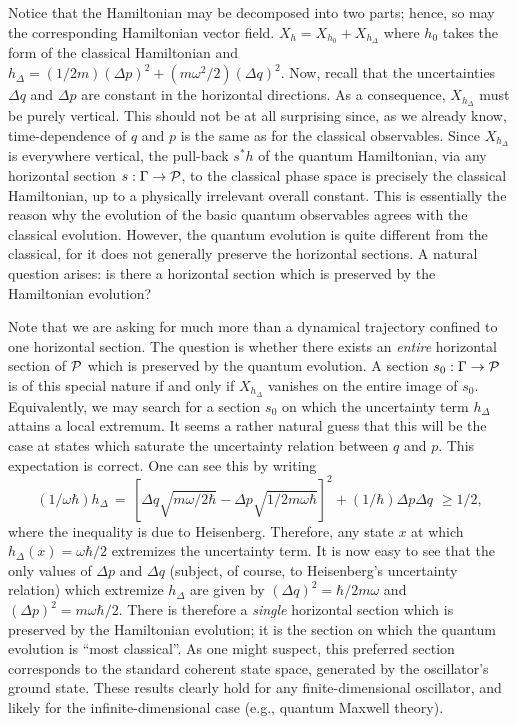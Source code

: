 \documentclass[12pt,aps,eqsecnum,tighten]{revtex4-2}
\def\be{\begin{equation}}
\def\ee{\end{equation}}
\def\P{{\cal P}}
\def\w{\omega}
\newcommand{\hvf}[1]{{X_{#1}}}
\begin{document}
Notice that the Hamiltonian may be decomposed into two parts; hence,
so may the corresponding Hamiltonian vector field.  $\hvf{h} =
\hvf{h_0} + \hvf{h_\Delta}$ where $h_0$ takes the form of the
classical Hamiltonian and $h_\Delta = (1/2m)(\Delta p)^2 +
(m\w^2/2)(\Delta q)^2$.  Now, recall that the uncertainties $\Delta q$
and $\Delta p$ are constant in the horizontal directions.  As a
consequence, $\hvf{h_\Delta}$ must be purely vertical.  This should
not be at all surprising since, as we already know, time-dependence of
$q$ and $p$ is the same as for the classical observables.  Since
$\hvf{h_\Delta}$ is everywhere vertical, the pull-back $s^* h$ of the
quantum Hamiltonian, via any horizontal section $s : \Gamma
\rightarrow \P$, to the classical phase space is precisely the
classical Hamiltonian, up to a physically irrelevant overall constant.
This is essentially the reason why the evolution of the basic quantum
observables agrees with the classical evolution.  However, the quantum
evolution is quite different from the classical, for it does not
generally preserve the horizontal sections.  A natural question
arises: is there a horizontal section which is preserved by the
Hamiltonian evolution?  

Note that we are asking for much more than a dynamical trajectory
confined to one horizontal section. The question is whether there
exists an {\it entire} horizontal section of $\P$ which is preserved
by the quantum evolution.  A section $s_0 : \Gamma \rightarrow \P$ is
of this special nature if and only if $\hvf{h_\Delta}$ vanishes on the
entire image of $s_0$.  Equivalently, we may search for a section
$s_0$ on which the uncertainty term $h_\Delta$ attains a local
extremum.  It seems a rather natural guess that this will be the case
at states which saturate the uncertainty relation between $q$ and $p$.
This expectation is correct.  One can see this by writing
%
\be 
(1/\w\hbar) h_\Delta \, = \, \left[ \Delta q \sqrt{m\w/2\hbar} -
\Delta p \sqrt{1/2m\w\hbar} \right]^2 + (1/\hbar) \Delta p \Delta q
\,\, \ge 1/2, 
\ee 
%
where the inequality is due to Heisenberg.  Therefore, any state $x$
at which $h_\Delta(x) = \w\hbar/2$ extremizes the uncertainty term.
It is now easy to see that the only values of $\Delta p$ and $\Delta
q$ (subject, of course, to Heisenberg's uncertainty relation) which
extremize $h_\Delta$ are given by $(\Delta q)^2 = \hbar/2m\w$ and
$(\Delta p)^2 = m\w\hbar/2$.  There is therefore a {\it single}
horizontal section which is preserved by the Hamiltonian evolution; it
is the section on which the quantum evolution is ``most classical''.
As one might suspect, this preferred section corresponds to the
standard coherent state space, generated by the oscillator's ground
state.  These results clearly hold for any finite-dimensional
oscillator, and likely for the infinite-dimensional case (e.g.,
quantum Maxwell theory).
\end{document}

